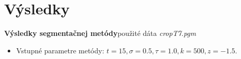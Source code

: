 \documentclass{beamer}
\begin{document}
\section{Výsledky}

\begin{frame}{\textbf{Výsledky segmentačnej metódy}}{použité dáta \textit{cropT7.pgm}}
\begin{itemize}
\item {\small Vstupné parametre metódy: $t = 15, \sigma = 0.5, \tau = 1.0, k = 500, z = -1.5$.}
\end{itemize}
	\begin{figure}
	\centering
      \qquad
	\end{figure}
\end{frame}
\end{document}
